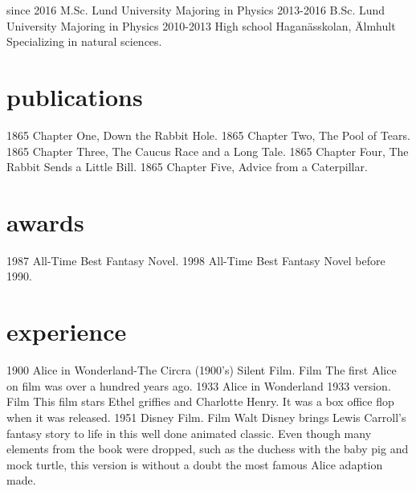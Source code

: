 \documentclass[]{twentysecondcv}
\begin{document}
\begin{twenty}
 \twentyitem
    {since 2016}
    {M.Sc.}
    {Lund University}
    {Majoring in Physics}
  \twentyitem
    {2013-2016}
    {B.Sc.}
    {Lund University}
    {Majoring in Physics}
  \twentyitem
    {2010-2013}
    {High school}
    {Hagan\"asskolan, \"Almhult}
    {Specializing in natural sciences.}
\end{twenty}


\section{publications}

\begin{twentyshort}
  \twentyitemshort
    {1865}
    {Chapter One, Down the Rabbit Hole.}
  \twentyitemshort
    {1865}
    {Chapter Two, The Pool of Tears.}
  \twentyitemshort
    {1865}
    {Chapter Three,  The Caucus Race and a Long Tale.}
  \twentyitemshort
    {1865}
    {Chapter Four,  The Rabbit Sends a Little Bill.}
  \twentyitemshort
    {1865}
    {Chapter Five,  Advice from a Caterpillar.}
\end{twentyshort}



\section{awards}

\begin{twentyshort}
  \twentyitemshort
    {1987}
    {All-Time Best Fantasy Novel.}
  \twentyitemshort
    {1998}
    {All-Time Best Fantasy Novel before 1990.}
\end{twentyshort}


\section{experience}

\begin{twenty}
  \twentyitem
    {1900}
    {Alice in Wonderland-The Circra (1900's) Silent Film.}
    {Film}
    {The first Alice on film was over a hundred years ago.}
  \twentyitem
    {1933}
    {Alice in Wonderland 1933 version.}
    {Film}
    {This film stars Ethel griffies and Charlotte Henry. It was a box office flop when it was released.}
\twentyitem
    {1951}
    {Disney Film.}
    {Film}
    {Walt Disney brings Lewis Carroll's fantasy story to life in this well done animated classic. Even though many elements from the book were dropped, such as the duchess with the baby pig and mock turtle, this version is without a doubt the most famous Alice adaption made.}

\end{twenty}
\end{document}
